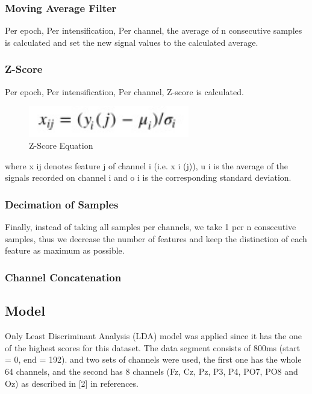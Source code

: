 \subsubsection{Moving Average Filter}
Per epoch, Per intensification, Per channel, the average of n consecutive samples is calculated and set the new signal values to the calculated average.
\subsubsection{Z-Score}
Per epoch, Per intensification, Per channel, Z-score is calculated.\newline\newline
\begin{figure}
    \centering
    \includegraphics[width=70mm]{images/z-score.jpg}
    \caption{Z-Score Equation}
    \label{fig:my_label}
\end{figure}
where x ij denotes feature j of channel i (i.e. x i (j)), u i is the average of the signals recorded on channel i and o i is the
corresponding standard deviation.
\subsubsection{Decimation of Samples}
Finally, instead of taking all samples per channels, we take 1 per n consecutive samples, thus we decrease the number of features and keep the distinction of each feature as maximum as possible.
\subsubsection{Channel Concatenation}


\subsection{Model}
Only Least Discriminant Analysis (LDA) model was applied since it has the one of the highest scores for this dataset.\newline
The data segment consists of 800ms (start = 0, end = 192). and two sets of channels were used, the first one has the whole 64 channels, and the second has 8 channels (Fz, Cz, Pz, P3, P4, PO7, PO8 and Oz) as described in [2] in references.

